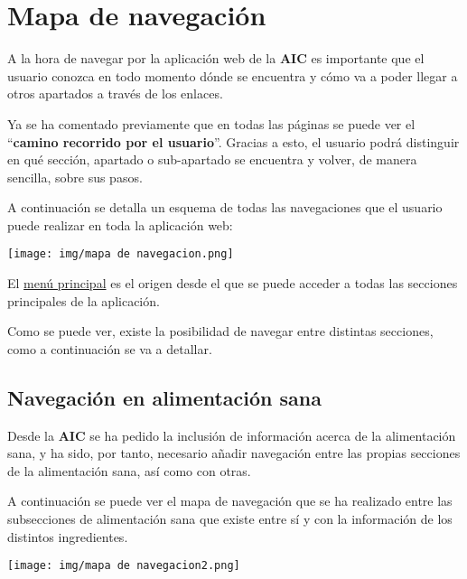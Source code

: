 \documentclass{\ClassPath/viu-tfm-template}
\begin{document}
\chapter{Mapa de navegación}
A la hora de navegar por la aplicación web de la \textbf{AIC} es importante que el usuario conozca en todo momento dónde se encuentra y cómo va a poder llegar a otros apartados a través de los enlaces.

Ya se ha comentado previamente que en todas las páginas se puede ver el “\textbf{camino recorrido por el usuario}”. Gracias a esto, el usuario podrá distinguir en qué sección, apartado o sub-apartado se encuentra y volver, de manera sencilla, sobre sus pasos.

A continuación se detalla un esquema de todas las navegaciones que el usuario puede realizar en toda la aplicación web:

\begin{center}
    \vspace{-10pt}
    \texttt{[image: img/mapa de navegacion.png]}
    \vspace{-20pt}
\end{center}

El \hyperlink{menu_principal}{menú principal} es el origen desde el que se puede acceder a todas las secciones principales de la aplicación.

Como se puede ver, existe la posibilidad de navegar entre distintas secciones, como a continuación se va a detallar.



\section{Navegación en alimentación sana}

Desde la \textbf{AIC} se ha pedido la inclusión de información acerca de la alimentación sana, y ha sido, por tanto, necesario añadir navegación entre las propias secciones de la alimentación sana, así como con otras.

A continuación se puede ver el mapa de navegación que se ha realizado entre las subsecciones de alimentación sana que existe entre sí y con la información de los distintos ingredientes.

\begin{center}
    \vspace{-10pt}
    \texttt{[image: img/mapa de navegacion2.png]}
    \vspace{-20pt}
\end{center}
\end{document}
